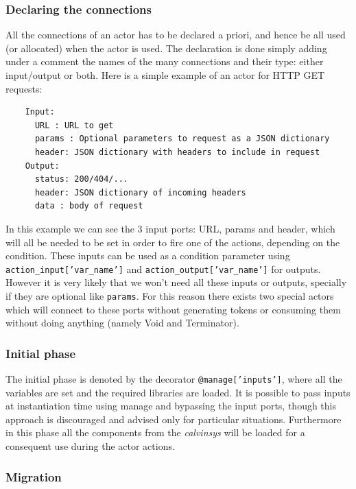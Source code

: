 \begin{itemize}
\begin{itemize}
\end{itemize}

\subsubsection{Declaring the connections}

All the connections of an actor has to be declared a priori, and hence be all used (or allocated)
when the actor is used. The declaration is done simply adding under a comment the names of the many connections
and their type: either input/output or both. Here is a simple example of an actor for HTTP GET requests:

\begin{verbatim}
    Input:
      URL : URL to get
      params : Optional parameters to request as a JSON dictionary
      header: JSON dictionary with headers to include in request
    Output:
      status: 200/404/...
      header: JSON dictionary of incoming headers
      data : body of request
\end{verbatim}

In this example we can see the 3 input ports: URL, params and header, which will all be needed to be set
in order to fire one of the actions, depending on the condition. These inputs can be used
as a condition parameter using \texttt{action\_input['var\_name']} and \texttt{action\_output['var\_name']}
for outputs.\\
However it is very likely that we won't need all these inputs or outputs, specially if they are optional
like \texttt{params}. For this reason there exists two special actors which will connect to these
ports without generating tokens or consuming them without doing anything (namely Void and Terminator).

\subsubsection{Initial phase}

The initial phase is denoted by the decorator \texttt{@manage['inputs']}, where all the variables
are set and the required libraries are loaded. It is possible to pass inputs at instantiation
time using manage and bypassing the input ports, though this approach is discouraged and
advised only for particular situations. Furthermore in this phase all the components
from the \textit{calvinsys} will be loaded for a consequent use during the actor actions.

\subsubsection{Migration}


\end{itemize}
